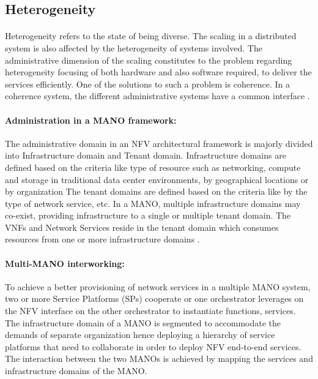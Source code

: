 \subsection{Heterogeneity}
\paragraph{}Heterogeneity refers to the state of being diverse. The scaling in a distributed system is also affected by the heterogeneity of systems involved. The administrative dimension of the scaling constitutes to the problem regarding heterogeneity focusing of both hardware and also software required, to deliver the services efficiently. One of the solutions to such a problem is coherence. In a coherence system, the different administrative systems have a common interface \cite{ord1994scale}.



\paragraph{Administration in a MANO framework:}
The administrative domain in an NFV architectural framework is majorly divided into Infrastructure domain and Tenant domain. Infrastructure domains are defined based on the criteria like type of resource such as networking, compute and storage in traditional data center environments, by geographical locations or by organization The tenant domains are defined based on the criteria like by the type of network service, etc. In a MANO, multiple infrastructure domains may co-exist, providing infrastructure to a single or multiple tenant domain. The VNFs and Network Services reside in the tenant domain which consumes resources from one or more infrastructure domains \cite{peinetwork}.

\paragraph{Multi-MANO interworking:}
To achieve a better provisioning of network services in a multiple MANO system, two or more Service Platforms (SPs) cooperate or one orchestrator leverages on the NFV interface on the other orchestrator to instantiate functions, services. The infrastructure domain of a MANO is segmented to accommodate the demands of separate organization hence deploying a hierarchy of service platforms that need to collaborate in order to deploy NFV end-to-end services. The interaction between the two MANOs is achieved by mapping the services and infrastructure domains of the MANO. 

